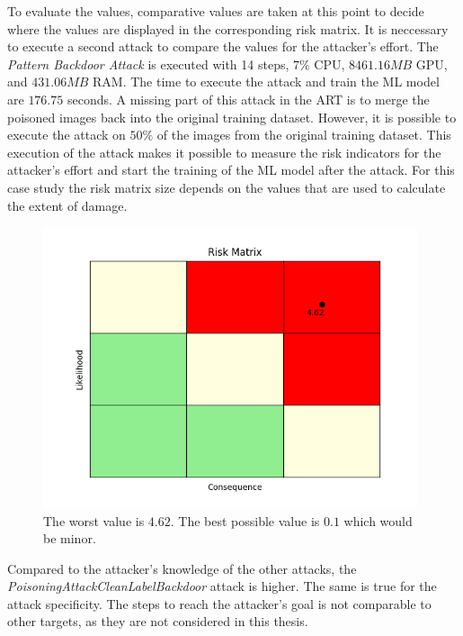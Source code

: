 To evaluate the values, comparative values are taken at this point to decide where the values are displayed in the corresponding risk matrix. It is neccessary to execute a second attack to compare the values for the attacker's effort. The \textit{Pattern Backdoor Attack} is executed with 14 steps, $7\%$ CPU, $8461.16MB$ GPU, and $431.06MB$ RAM. The time to execute the attack and train the ML model are $176.75$ seconds. A missing part of this attack in the ART is to merge the poisoned images back into the original training dataset. However, it is possible to execute the attack on $50\%$ of the images from the original training dataset. This execution of the attack makes it possible to measure the risk indicators for the attacker's effort and start the training of the ML model after the attack. For this case study the risk matrix size depends on the values that are used to calculate the extent of damage.

\begin{figure}[ht!]
  \centering
  \includegraphics[width=11cm]{pictures/extent_of_damage_matrix.png}
  \caption{The worst value is $4.62$. The best possible value is $0.1$ which would be minor.}
  \label{fig:extent_of_damage_matrix}
\end{figure}

Compared to the attacker's knowledge of the other attacks, the \textit{PoisoningAttackCleanLabelBackdoor} attack is higher. The same is true for the attack specificity.
The steps to reach the attacker's goal is not comparable to other targets, as they are not considered in this thesis.

